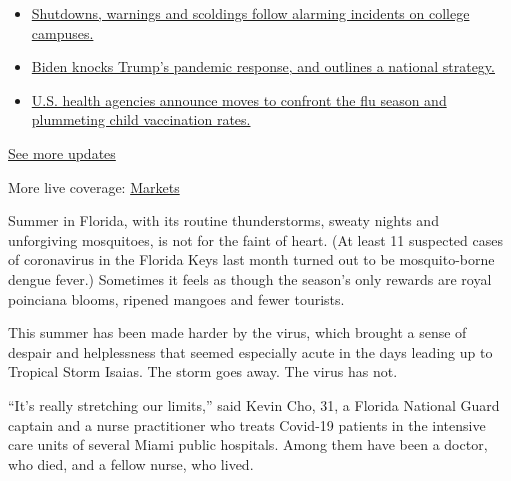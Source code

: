 \begin{itemize}
\tightlist
\item
  \href{https://www.nytimes3xbfgragh.onion/2020/08/20/world/coronavirus-covid.html?action=click\&pgtype=Article\&state=default\&region=MAIN_CONTENT_1\&context=storylines_live_updates\#link-68774d88}{Shutdowns,
  warnings and scoldings follow alarming incidents on college campuses.}
\item
  \href{https://www.nytimes3xbfgragh.onion/2020/08/20/world/coronavirus-covid.html?action=click\&pgtype=Article\&state=default\&region=MAIN_CONTENT_1\&context=storylines_live_updates\#link-26b58724}{Biden
  knocks Trump's pandemic response, and outlines a national strategy.}
\item
  \href{https://www.nytimes3xbfgragh.onion/2020/08/20/world/coronavirus-covid.html?action=click\&pgtype=Article\&state=default\&region=MAIN_CONTENT_1\&context=storylines_live_updates\#link-4e542da3}{U.S.
  health agencies announce moves to confront the flu season and
  plummeting child vaccination rates.}
\end{itemize}

\href{https://www.nytimes3xbfgragh.onion/2020/08/20/world/coronavirus-covid.html?action=click\&pgtype=Article\&state=default\&region=MAIN_CONTENT_1\&context=storylines_live_updates}{See
more updates}

More live coverage:
\href{https://www.nytimes3xbfgragh.onion/live/2020/08/20/business/stock-market-today-coronavirus?action=click\&pgtype=Article\&state=default\&region=MAIN_CONTENT_1\&context=storylines_live_updates}{Markets}

Summer in Florida, with its routine thunderstorms, sweaty nights and
unforgiving mosquitoes, is not for the faint of heart. (At least 11
suspected cases of coronavirus in the Florida Keys last month turned out
to be mosquito-borne dengue fever.) Sometimes it feels as though the
season's only rewards are royal poinciana blooms, ripened mangoes and
fewer tourists.

This summer has been made harder by the virus, which brought a sense of
despair and helplessness that seemed especially acute in the days
leading up to Tropical Storm Isaias. The storm goes away. The virus has
not.

``It's really stretching our limits,'' said Kevin Cho, 31, a Florida
National Guard captain and a nurse practitioner who treats Covid-19
patients in the intensive care units of several Miami public hospitals.
Among them have been a doctor, who died, and a fellow nurse, who lived.

